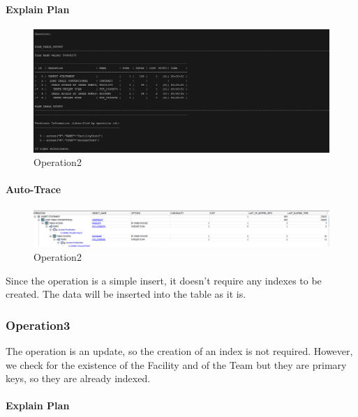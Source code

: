 \paragraph{Explain Plan} \leavevmode \newline

\begin{figure}[H]
    \centering
    \includegraphics[width=\textwidth]{images/ExPlan2.png}
    \caption{Operation2}
\end{figure}

\paragraph{Auto-Trace} \leavevmode \newline

\begin{figure}[H]
    \centering
    \includegraphics[width=\textwidth]{images/Op2Index.png}
    \caption{Operation2}
\end{figure}

Since the operation is a simple insert, it doesn't require any indexes to be created. The data will be inserted into the table as it is.

\subsubsection{Operation3}
The operation is an update, so the creation of an index is not required. However, we check for the existence of the Facility and of the Team but they are primary keys, so they are already indexed.

\paragraph{Explain Plan} \leavevmode \newline


